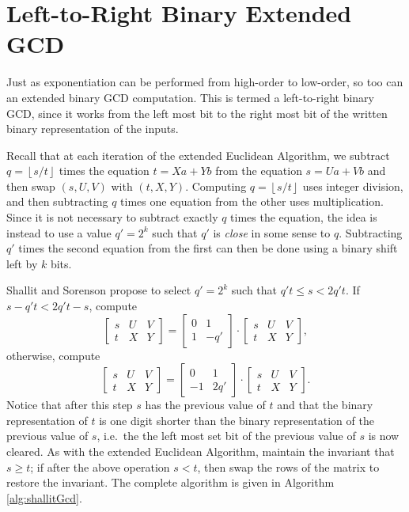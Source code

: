 \documentclass{ucalgthes1}
\theoremstyle{definition}
\newcommand{\matrixtt}[4]{\left[ \begin{array}{rr} #1 & #2 \\ #3 & #4 \end{array} \right]}
\newcommand{\matrixThreeTwo}[6]{\left[ \begin{array}{rrr} #1 & #2 & #3 \\ #4 & #5 & #6 \end{array} \right]}
\newcommand{\floor}[1]{\left\lfloor #1 \right\rfloor}
\begin{document}
\section{Left-to-Right Binary Extended GCD}
\label{sec:gcdL2R}

Just as exponentiation can be performed from high-order to low-order, so too can an extended binary GCD computation.  This is termed a left-to-right binary GCD, since it works from the left most bit to the right most bit of the written binary representation of the inputs.

Recall that at each iteration of the extended Euclidean Algorithm, we subtract $q = \floor{s/t}$ times the equation $t = Xa + Yb$ from the equation $s = Ua + Vb$ and then swap $(s, U, V)$ with $(t, X, Y)$.  Computing $q=\floor{s/t}$ uses integer division, and then subtracting $q$ times one equation from the other uses multiplication.  Since it is not necessary to subtract exactly $q$ times the equation, the idea is instead to use a value $q' = 2^k$ such that $q'$ is \emph{close} in some sense to $q$.  Subtracting $q'$ times the second equation from the first can then be done using a binary shift left by $k$ bits.

Shallit and Sorenson \cite{Shallit1994} propose to select $q'=2^k$ such that $q't \le s < 2q't$.  If $s - q't < 2q't - s$, compute
\[
	\matrixThreeTwo{s}{U}{V}{t}{X}{Y} =
		\matrixtt{0}{1}{1}{-q'} \cdot \matrixThreeTwo{s}{U}{V}{t}{X}{Y},
\]
otherwise, compute
\[
	\matrixThreeTwo{s}{U}{V}{t}{X}{Y} =
		\matrixtt{0}{1}{-1}{2q'} \cdot \matrixThreeTwo{s}{U}{V}{t}{X}{Y}.
\]
Notice that after this step $s$ has the previous value of $t$ and that the binary representation of $t$ is one digit shorter than the binary representation of the previous value of $s$, i.e.\ the the left most set bit of the previous value of $s$ is now cleared.  As with the extended Euclidean Algorithm, maintain the invariant that $s \ge t$; if after the above operation $s < t$, then swap the rows of the matrix to restore the invariant. The complete algorithm is given in Algorithm \ref{alg:shallitGcd}.
\end{document}
